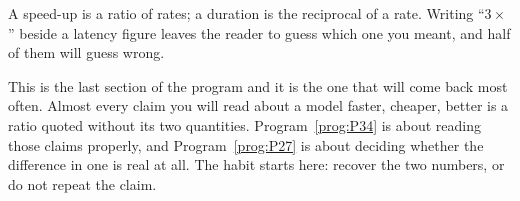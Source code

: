 \begin{fr}
A speed-up is a ratio of rates; a duration is the reciprocal of a rate. Writing
\enquote{$3\times$} beside a latency figure leaves the reader to guess which
one you meant, and half of them will guess wrong.

\begin{aibox}
This is the last section of the program and it is the one that will come back
most often. Almost every claim you will read about a model \dash{} faster,
cheaper, better \dash{} is a ratio quoted without its two quantities.
Program~\ref{prog:P34} is about reading those claims properly, and
Program~\ref{prog:P27} is about deciding whether the difference in one is real
at all. The habit starts here: recover the two numbers, or do not repeat the
claim.
\end{aibox}
\end{fr}

